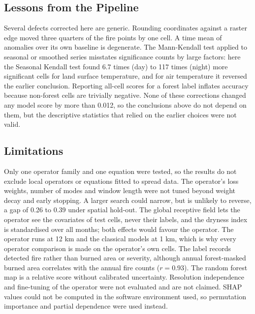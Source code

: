 \documentclass[journal]{IEEEtran}
\begin{document}
\subsection{Lessons from the Pipeline}
Several defects corrected here are generic. Rounding coordinates against a raster edge moved three quarters of the fire points by one cell. A time mean of anomalies over its own baseline is degenerate. The Mann-Kendall test applied to seasonal or smoothed series misstates significance counts by large factors: here the Seasonal Kendall test found 6.7 times (day) to 117 times (night) more significant cells for land surface temperature, and for air temperature it reversed the earlier conclusion. Reporting all-cell scores for a forest label inflates accuracy because non-forest cells are trivially negative. None of these corrections changed any model score by more than 0.012, so the conclusions above do not depend on them, but the descriptive statistics that relied on the earlier choices were not valid.

\subsection{Limitations}
Only one operator family and one equation were tested, so the results do not exclude local operators or equations fitted to spread data. The operator's loss weights, number of modes and window length were not tuned beyond weight decay and early stopping. A larger search could narrow, but is unlikely to reverse, a gap of 0.26 to 0.39 under spatial hold-out. The global receptive field lets the operator see the covariates of test cells, never their labels, and the dryness index is standardised over all months; both effects would favour the operator. The operator runs at 12 km and the classical models at 1 km, which is why every operator comparison is made on the operator's own cells. The label records detected fire rather than burned area or severity, although annual forest-masked burned area correlates with the annual fire counts ($r=0.93$). The random forest map is a relative score without calibrated uncertainty. Resolution independence and fine-tuning of the operator were not evaluated and are not claimed. SHAP values could not be computed in the software environment used, so permutation importance and partial dependence were used instead.

\end{document}
